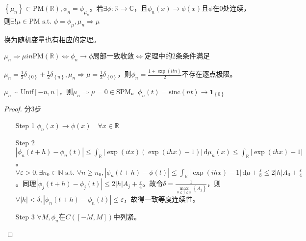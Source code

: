 \documentclass{ctexart}
\begin{document}
\begin{Thm}
  $\left\{ \mu_n \right\}\subset \mathrm{PM}(\mathbb{R}), \phi_n=\phi_{\mu_n}$。若$\exists \phi: \mathbb{R}\to\mathbb{C}$，且$\phi_n(x)\to \phi(x)$且$\phi$在0处连续，则$\exists !\mu\in \mathrm{PM} \text{ s.t. } \phi=\phi_{\mu}, \mu_n\Rightarrow \mu$
\end{Thm}

换为随机变量也有相应的定理。

\begin{Cor}
  $\mu_n\Rightarrow \mu in \mathrm{PM}(\mathbb{R})\Leftrightarrow \phi_n \to \phi$局部一致收敛$\Leftrightarrow$定理中的2条条件满足
\end{Cor}

\begin{Eg}
  $\mu_n= \frac{1}{2}\delta_{\left\{ 0 \right\}}+ \frac{1}{2}\delta_{\left\{ n \right\}}, \mu_n\Rightarrow \mu= \frac{1}{2} \delta_{\left\{ 0 \right\}}$，则$\phi_n=\frac{1+\exp(it n)}{2}$不存在逐点极限。
\end{Eg}

\begin{Eg}
  $\mu_n\sim \mathrm{Unif}\left[ -n,n \right]$，则$\mu_n\Rightarrow \mu=0\in \mathrm{SPM}$。$\phi_n(t)= \mathrm{sinc}(nt) \to \bm{1}_{\left\{ 0 \right\}}$
\end{Eg}

\begin{proof}
  分3步
\begin{itemize}
\item[Step 1] $\phi_n(x)\to \phi(x) \quad \forall x\in \mathbb{R}$ 
\item[Step 2] $|\phi_n(t+h)-\phi_n(t)|\leq \int_{\mathbb{R}}|\exp(itx)(\exp(ihx)-1)| \,\mathrm{d}\mu_n(x)\leq \int_{\mathbb{R}}|\exp(ihx)-1|$。$\forall \varepsilon>0, \exists n_0\in \mathbb{N} \text{ s.t. } \forall n\geq n_0, |\phi_n(t+h)-\phi(t)|\leq \int_{\mathbb{R}}|\exp(ihx)-1| \,\mathrm{d}\mu +\frac{\varepsilon}{8}\leq 2 |h|A_0 +\frac{\varepsilon}{4}$。同理$|\phi_j(t+h)-\phi_j(t)|\leq 2|h|A_j +\frac{\varepsilon}{4}$。故令$\delta=\frac{1}{\max\limits_{0\leq j\leq n} \left\{ A_j \right\}}$，则$\forall |h|<\delta, |\phi_n(t+h)-\phi_n(t)|\leq \varepsilon$，故得一致等度连续性。
\item[Step 3] $\forall M, \phi_n$在$C([-M,M])$中列紧。
\end{itemize}
\end{proof}
\end{document}
